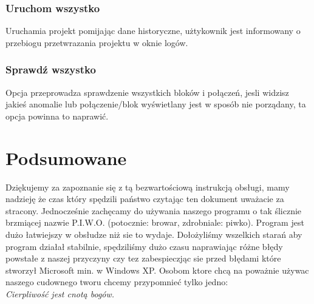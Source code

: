 \documentclass[a4paper,10pt]{article}
\begin{document}
\subsubsection{Uruchom wszystko}
Uruchamia projekt pomijając dane historyczne, użtykownik jest informowany o przebiogu przetwrazania projektu w oknie logów.
\subsubsection{Sprawdź wszystko}
Opcja przeprowadza sprawdzenie wszystkich bloków i połączeń, jesli widzisz jakieś anomalie lub połączenie/blok wyświetlany jest w sposób nie porządany, ta opcja powinna to naprawić.
\section{Podsumowane}
Dziękujemy za zapoznanie się z tą bezwartościową instrukcją obsługi, mamy nadzieję że czas który spędzili państwo czytając ten dokument uważacie za stracony. Jednocześnie zachęcamy do używania naszego programu o tak ślicznie brzmiącej nazwie P.I.W.O. (potocznie: browar, zdrobniale: piwko). Program jest dużo łatwiejszy w obsłudze niż sie to wydaje. Dołożyliśmy wszelkich starań aby program działał stabilnie, spędziliśmy dużo czasu naprawiając różne błędy powstałe z naszej przyczyny czy tez zabespieczjąc sie przed błędami które stworzył Microsoft min. w Windows XP. Osobom ktore chcą na poważnie używac naszego cudownego tworu chcemy przypomnieć tylko jedno:\\\textit{Cierpliwość jest cnotą bogów.}
\end{document}
